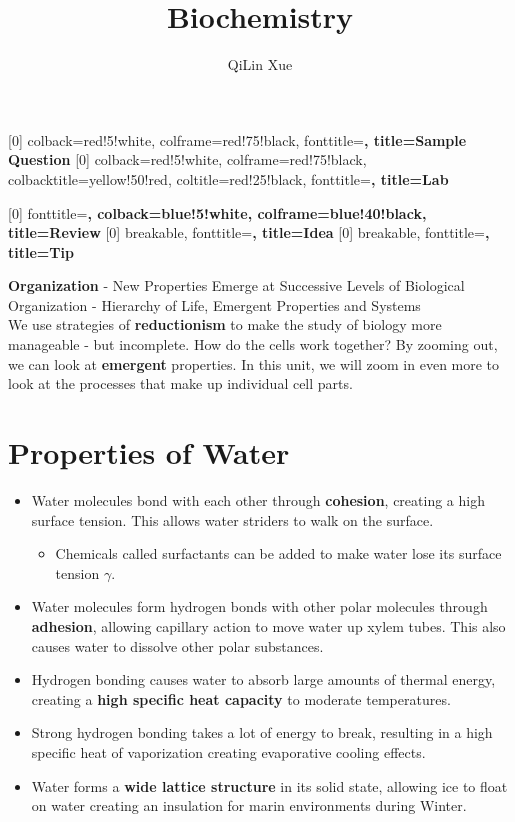 \documentclass[letterpaper]{article}
\title{Biochemistry}
\author{QiLin Xue}
\date{ }
\numberwithin{equation}{section}
\theoremstyle{classic}
\begin{document}
[0]{
    colback=red!5!white,
    colframe=red!75!black,
    fonttitle=\bfseries,
    title=Sample Question
}
[0]{
    colback=red!5!white,
    colframe=red!75!black,
    colbacktitle=yellow!50!red,
    coltitle=red!25!black,
    fonttitle=\bfseries,
    title=Lab
}

[0]{
    fonttitle=\bfseries,
    colback=blue!5!white,
    colframe=blue!40!black,
    title=Review
}
[0]{
    breakable,
    fonttitle=\bfseries,
    title=Idea
}
[0]{
    breakable,
    fonttitle=\bfseries,
    title=Tip
}
\maketitle

\tableofcontents
\newpage

\begin{review}
    \textbf{Organization} - New Properties Emerge at Successive Levels of Biological Organization - Hierarchy of Life, Emergent Properties and Systems \\

    We use strategies of \textbf{reductionism} to make the study of biology more manageable - but incomplete. How do the cells work together? By zooming out, we can look at \textbf{emergent} properties. In this unit, we will zoom in even more to look at the processes that make up individual cell parts.
\end{review}
\section{Properties of Water}
\begin{itemize}
    \item Water molecules bond with each other through \textbf{cohesion}, creating a high surface tension. This allows water striders to walk on the surface.
    \begin{itemize}
        \item Chemicals called surfactants can be added to make water lose its surface tension $\gamma$.
    \end{itemize}
    \item Water molecules form hydrogen bonds with other polar molecules through \textbf{adhesion}, allowing capillary action to move water up xylem tubes. This also causes water to dissolve other polar substances.
    \item Hydrogen bonding causes water to absorb large amounts of thermal energy, creating a \textbf{high specific heat capacity} to moderate temperatures.
    \item Strong hydrogen bonding takes a lot of energy to break, resulting in a high specific heat of vaporization creating evaporative cooling effects.
    \item Water forms a \textbf{wide lattice structure} in its solid state, allowing ice to float on water creating an insulation for marin environments during Winter.
\end{itemize}
\newpage
\end{document}
